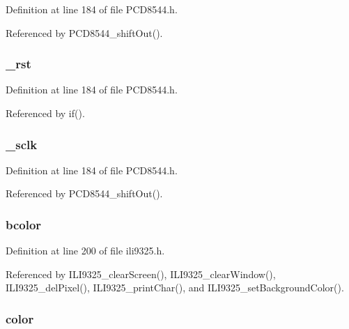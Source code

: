 Definition at line 184 of file P\-C\-D8544.\-h.



Referenced by P\-C\-D8544\-\_\-shift\-Out().

\hypertarget{structlcd__t_a6d45704f8cc0a5ac9fb38c69c4efa10e}{
\subsubsection[{\-\_\-rst}]{ \-\_\-rst}}\label{structlcd__t_a6d45704f8cc0a5ac9fb38c69c4efa10e}


Definition at line 184 of file P\-C\-D8544.\-h.



Referenced by if().

\hypertarget{structlcd__t_adabf5610095f79e1ca781233a23f2c2a}{
\subsubsection[{\-\_\-sclk}]{ \-\_\-sclk}}\label{structlcd__t_adabf5610095f79e1ca781233a23f2c2a}


Definition at line 184 of file P\-C\-D8544.\-h.



Referenced by P\-C\-D8544\-\_\-shift\-Out().

\hypertarget{structlcd__t_a30a1d46222004b922cb03a640ee42428}{
\subsubsection[{bcolor}]{ bcolor}}\label{structlcd__t_a30a1d46222004b922cb03a640ee42428}


Definition at line 200 of file ili9325.\-h.



Referenced by I\-L\-I9325\-\_\-clear\-Screen(), I\-L\-I9325\-\_\-clear\-Window(), I\-L\-I9325\-\_\-del\-Pixel(), I\-L\-I9325\-\_\-print\-Char(), and I\-L\-I9325\-\_\-set\-Background\-Color().

\hypertarget{structlcd__t_a7b6a8ec65935cf4cd99c962fc7ec93f5}{
\subsubsection[{color}]{ color}}\label{structlcd__t_a7b6a8ec65935cf4cd99c962fc7ec93f5}


